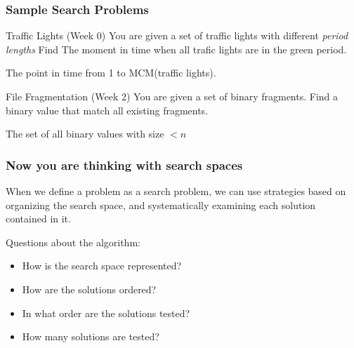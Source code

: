 \documentclass{beamer}
\begin{document}
\begin{frame}
  \frametitle{Sample Search Problems}
  \begin{block}{Traffic Lights (Week 0)}  
    You are given a set of traffic lights with different \emph{period lengths}
    \alert{Find} The moment in time when all trafic lights are in the
    green period.

    \bigskip

     The point in time from 1 to MCM(traffic lights).
  \end{block}

  \begin{block}{File Fragmentation (Week 2)}
    You are given a set of binary fragments. \alert{Find} a binary
    value that match all existing fragments.

    \bigskip

     The set of all binary values with size $< n$
  \end{block}

\end{frame}


\begin{frame}
  \frametitle{Now you are thinking with search spaces}

  When we define a problem as a search problem, we can use strategies
  based on organizing the search space, and systematically examining
  each solution contained in it.

  \bigskip

  Questions about the algorithm:
  \begin{itemize}
  \item How is the search space represented?
  \item How are the solutions ordered?
  \item In what order are the solutions tested?
  \item How many solutions are tested?
  \end{itemize}
\end{frame}
\end{document}
